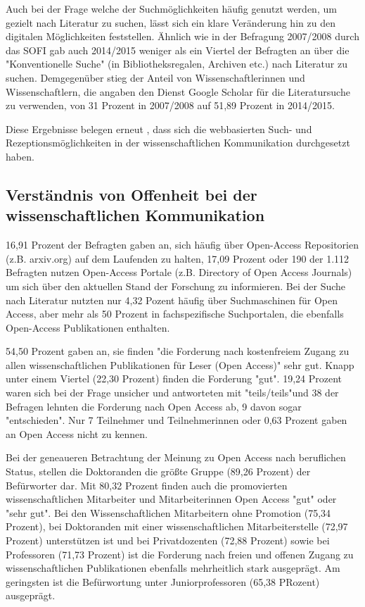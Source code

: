Auch bei der Frage welche der Suchmöglichkeiten häufig genutzt werden, um gezielt nach Literatur zu suchen, lässt sich ein klare Veränderung hin zu den digitalen Möglichkeiten feststellen. Ähnlich wie in der Befragung 2007/2008 durch das SOFI gab auch 2014/2015 weniger als ein Viertel der Befragten an über die "Konventionelle Suche" (in Bibliotheksregalen, Archiven etc.) nach Literatur zu suchen. Demgegenüber stieg der Anteil von Wissenschaftlerinnen und Wissenschaftlern, die angaben den Dienst Google Scholar für die Literatursuche zu verwenden, von 31 Prozent in 2007/2008 auf 51,89 Prozent in 2014/2015.

Diese Ergebnisse belegen erneut \cite{Hanekop_2014}, dass sich die webbasierten Such- und Rezeptionsmöglichkeiten in der wissenschaftlichen Kommunikation durchgesetzt haben.

\subsection{Verständnis von Offenheit bei der wissenschaftlichen Kommunikation}

16,91 Prozent der Befragten gaben an, sich häufig über Open-Access Repositorien (z.B. arxiv.org) auf dem Laufenden zu halten, 17,09 Prozent oder 190 der 1.112 Befragten nutzen Open-Access Portale (z.B. Directory of Open Access Journals) um sich über den aktuellen Stand der Forschung zu informieren. Bei der Suche nach Literatur nutzten nur 4,32 Pozent häufig über Suchmaschinen für Open Access, aber mehr als 50 Prozent in fachspezifische Suchportalen, die ebenfalls Open-Access Publikationen enthalten.

54,50 Prozent gaben an, sie finden "die Forderung nach kostenfreiem Zugang zu allen wissenschaftlichen Publikationen für Leser (Open Access)" sehr gut. Knapp unter einem Viertel (22,30 Prozent) finden die Forderung "gut". 19,24 Prozent waren sich bei der Frage unsicher und antworteten mit "teils/teils"und 38 der Befragen lehnten die Forderung nach Open Access ab, 9 davon sogar "entschieden". Nur 7 Teilnehmer und Teilnehmerinnen oder 0,63 Prozent gaben an Open Access nicht zu kennen.

Bei der geneaueren Betrachtung der Meinung zu Open Access nach beruflichen Status, stellen die Doktoranden die größte Gruppe (89,26 Prozent) der Befürworter dar. Mit 80,32 Prozent finden auch die promovierten wissenschaftlichen Mitarbeiter und Mitarbeiterinnen Open Access "gut" oder "sehr gut". Bei den Wissenschaftlichen Mitarbeitern ohne Promotion (75,34 Prozent), bei Doktoranden mit einer wissenschaftlichen Mitarbeiterstelle (72,97 Prozent) unterstützen ist und bei Privatdozenten (72,88 Prozent) sowie bei Professoren (71,73 Prozent) ist die Forderung nach freien und offenen Zugang zu wissenschaftlichen Publikationen ebenfalls mehrheitlich stark ausgeprägt.  Am geringsten ist die Befürwortung unter Juniorprofessoren (65,38 PRozent) ausgeprägt.

